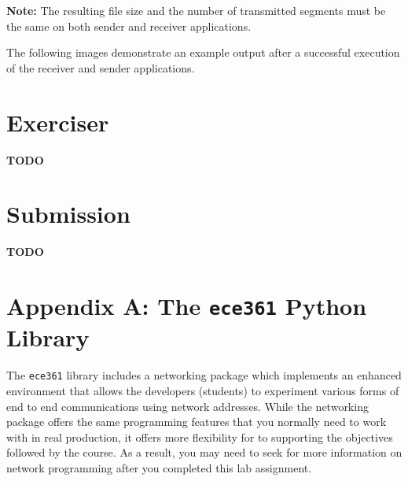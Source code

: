 \documentclass[11pt]{article}
\begin{document}

\textbf{Note:}
The resulting file size and the number of transmitted segments must be the same on both sender and receiver applications.


The following images demonstrate an example output after a successful execution of the receiver and sender applications.


\section{Exerciser}
\label{sec:exercise}
\textbf{TODO}

\section{Submission}
\label{sec:submission}
\textbf{TODO}

\newpage
\section{Appendix A: The \texttt{ece361} Python Library}
\label{sec:appendix-ece361-lib}
The \texttt{ece361} library includes a networking package which implements an enhanced environment that allows the developers (students) to experiment various forms of end to end communications using network addresses. While the networking package offers the same programming features that you normally need to work with in real production, it offers more flexibility for to supporting the objectives followed by the course. As a result, you may need to seek for more information on network programming after you completed this lab assignment.
\end{document}
